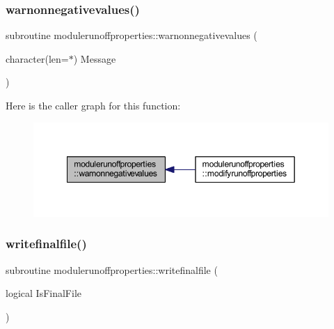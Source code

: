 \subsubsection{\texorpdfstring{warnonnegativevalues()}{warnonnegativevalues()}}
{\footnotesize\ttfamily subroutine modulerunoffproperties\+::warnonnegativevalues (\begin{DoxyParamCaption}\item[{character(len=$\ast$)}]{Message }\end{DoxyParamCaption})\hspace{0.3cm}{\ttfamily [private]}}

Here is the caller graph for this function\+:\nopagebreak
\begin{figure}[H]
\begin{center}
\leavevmode
\includegraphics[width=349pt]{namespacemodulerunoffproperties_a1a87c5174a0925e3408e5da2941a3e01_icgraph}
\end{center}
\end{figure}
\mbox{\label{namespacemodulerunoffproperties_a5e8bd361c7dae7925a217f4a40d2c75a}} 
\subsubsection{\texorpdfstring{writefinalfile()}{writefinalfile()}}
{\footnotesize\ttfamily subroutine modulerunoffproperties\+::writefinalfile (\begin{DoxyParamCaption}\item[{logical}]{Is\+Final\+File }\end{DoxyParamCaption})\hspace{0.3cm}{\ttfamily [private]}}


